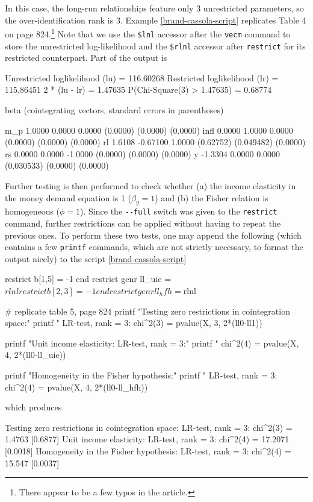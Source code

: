 In this case, the long-run relationships feature only 3 unrestricted
parameters, so the over-identification rank is 3. Example
\ref{brand-cassola-script} replicates Table 4 on page
824.\footnote{There appear to be a few typos in the article.} Note
that we use the \verb|$lnl| accessor after the \texttt{vecm} command
to store the unrestricted log-likelihood and the \verb|$rlnl| accessor
after \texttt{restrict} for its restricted counterpart. Part of the
output is
\begin{code}
Unrestricted loglikelihood (lu) = 116.60268
Restricted loglikelihood (lr) = 115.86451
2 * (lu - lr) = 1.47635
P(Chi-Square(3) > 1.47635) = 0.68774

beta (cointegrating vectors, standard errors in parentheses)

m_p        1.0000       0.0000       0.0000 
          (0.0000)     (0.0000)     (0.0000) 
infl       0.0000       1.0000       0.0000 
          (0.0000)     (0.0000)     (0.0000) 
rl         1.6108     -0.67100       1.0000 
         (0.62752)   (0.049482)     (0.0000) 
rs         0.0000       0.0000      -1.0000 
          (0.0000)     (0.0000)     (0.0000) 
y         -1.3304       0.0000       0.0000 
        (0.030533)     (0.0000)     (0.0000) 
\end{code}

Further testing is then performed to check whether (a) the income
elasticity in the money demand equation is 1 ($\beta_y = 1$) and (b)
the Fisher relation is homogeneous ($\phi = 1$). Since the
\verb|--full| switch was given to the \texttt{restrict} command,
further restrictions can be applied without having to repeat the
previous ones. To perform these two tests, one may append the
following (which contains a few \texttt{printf} commands, which are
not strictly necessary, to format the output nicely) to the script
\ref{brand-cassola-script}
\begin{code}
restrict
  b[1,5] = -1
end restrict
genr ll_uie = $rlnl

restrict
  b[2,3] = -1
end restrict
genr ll_hfh = $rlnl

# replicate table 5, page 824
printf "Testing zero restrictions in cointegration space:\n"
printf "  LR-test, rank = 3: chi^2(3) = %
	pvalue(X, 3, 2*(ll0-ll1))

printf "Unit income elasticity: LR-test, rank = 3:\n"
printf "  chi^2(4) = %
	pvalue(X, 4, 2*(ll0-ll_uie))

printf "Homogeneity in the Fisher hypothesis:\n"
printf "  LR-test, rank = 3: chi^2(4) = %
	pvalue(X, 4, 2*(ll0-ll_hfh))
\end{code}
which produces
\begin{code}
Testing zero restrictions in cointegration space:
  LR-test, rank = 3: chi^2(3) = 1.4763 [0.6877]
Unit income elasticity: LR-test, rank = 3:
  chi^2(4) = 17.2071 [0.0018]
Homogeneity in the Fisher hypothesis:
  LR-test, rank = 3: chi^2(4) = 15.547 [0.0037]  
\end{code}

